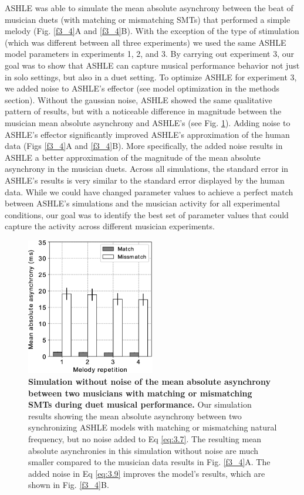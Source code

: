 \documentclass{report}
\begin{document}
ASHLE was able to simulate the mean absolute asynchrony between the beat of musician duets (with matching or mismatching SMTs) that performed a simple melody (Fig.{} \ref{f3_4}A and \ref{f3_4}B). With the exception of the type of stimulation (which was different between all three experiments) we used the same ASHLE model parameters in experiments 1, 2, and 3. By carrying out experiment 3, our goal was to show that ASHLE can capture musical performance behavior not just in solo settings, but also in a duet setting. To optimize ASHLE for experiment 3, we added noise to ASHLE's effector (see model optimization in the methods section). Without the gaussian noise, ASHLE showed the same qualitative pattern of results, but with a noticeable difference in magnitude between the musician mean absolute asynchrony and ASHLE's (see Fig.{} \ref{f3_5}). Adding noise to ASHLE's effector significantly improved ASHLE's approximation of the human data (Figs \ref{f3_4}A and \ref{f3_4}B). More specifically, the added noise results in ASHLE a better approximation of the magnitude of the mean absolute asynchrony in the musician duets. Across all simulations, the standard error in ASHLE's results is very similar to the standard error displayed by the human data. While we could have changed parameter values to achieve a perfect match between ASHLE's simulations and the musician activity for all experimental conditions, our goal was to identify the best set of parameter values that could capture the activity across different musician experiments.

\begin{figure}
    \centering
    \includegraphics[width=0.5\textwidth]{figures/fig3_5.png}
    \caption[Simulation without noise of the mean absolute asynchrony between two musicians with matching or mismatching SMTs during duet musical performance]{\textbf{Simulation without noise of the mean absolute asynchrony between two musicians with matching or mismatching SMTs during duet musical performance.} Our simulation results showing the mean absolute asynchrony between two synchronizing ASHLE models with matching or mismatching natural frequency, but no noise added to Eq \eqref{eq:3.7}. The resulting mean absolute asynchronies in this simulation without noise are much smaller compared to the musician data results in Fig.{} \ref{f3_4}A. The added noise in Eq \eqref{eq:3.9} improves the model's results, which are shown in Fig.{} \ref{f3_4}B.}
    \label{f3_5}
\end{figure}
\end{document}
